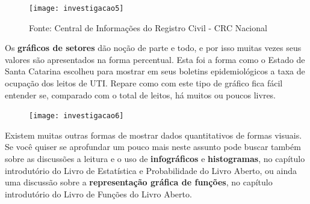 \begin{figure}[H]
\centering
\texttt{[image: investigacao5]}

\caption{Fonte: Central de Informações do Registro Civil - CRC Nacional}
\end{figure}

Os \textbf{gráficos de setores} dão noção de parte e todo, e por isso muitas vezes seus valores são apresentados na forma percentual. Esta foi a forma como o Estado de Santa Catarina escolheu para mostrar em seus boletins epidemiológicos a taxa de ocupação dos leitos de UTI. Repare como com este tipo de gráfico fica fácil entender se, comparado com o total de leitos, há muitos ou poucos livres.

\begin{figure}[H]
\centering
\texttt{[image: investigacao6]}

\end{figure}


Existem muitas outras formas de mostrar dados quantitativos de formas visuais. Se você quiser se aprofundar um pouco mais neste assunto pode buscar também sobre as discussões a leitura e o uso de \textbf{infográficos} e \textbf{histogramas}, no capítulo introdutório do Livro de Estatística e Probabilidade do Livro Aberto, ou ainda uma discussão sobre a \textbf{representação gráfica de funções}, no capítulo introdutório do Livro de Funções do Livro Aberto. 


